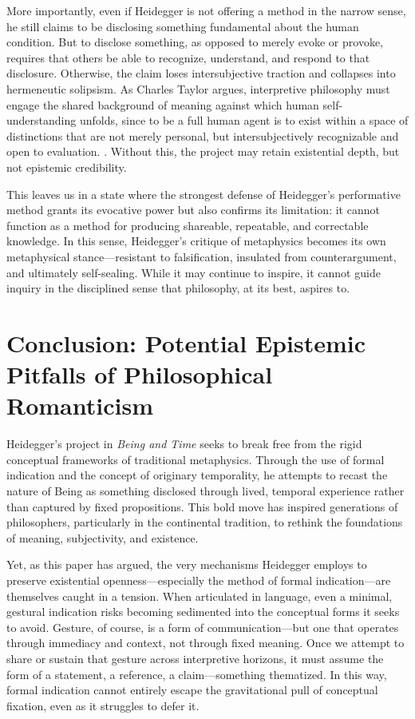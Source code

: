 \documentclass{article}
\begin{document}
More importantly, even if Heidegger is not offering a method in the narrow sense, he still claims to be disclosing something fundamental about the human condition. But to disclose something, as opposed to merely evoke or provoke, requires that others be able to recognize, understand, and respond to that disclosure. Otherwise, the claim loses intersubjective traction and collapses into hermeneutic solipsism. As Charles Taylor argues, interpretive philosophy must engage the shared background of meaning against which human self-understanding unfolds, since to be a full human agent is to exist within a space of distinctions that are not merely personal, but intersubjectively recognizable and open to evaluation. \parencite[p.~3]{taylor1985}. Without this, the project may retain existential depth, but not epistemic credibility.

This leaves us in a state where the strongest defense of Heidegger's performative method grants its evocative power but also confirms its limitation: it cannot function as a method for producing shareable, repeatable, and correctable knowledge. In this sense, Heidegger's critique of metaphysics becomes its own metaphysical stance—resistant to falsification, insulated from counterargument, and ultimately self-sealing. While it may continue to inspire, it cannot guide inquiry in the disciplined sense that philosophy, at its best, aspires to.

\section*{Conclusion: Potential Epistemic Pitfalls of Philosophical Romanticism}

Heidegger’s project in \textit{Being and Time} seeks to break free from the rigid conceptual frameworks of traditional metaphysics. Through the use of formal indication and the concept of originary temporality, he attempts to recast the nature of Being as something disclosed through lived, temporal experience rather than captured by fixed propositions. This bold move has inspired generations of philosophers, particularly in the continental tradition, to rethink the foundations of meaning, subjectivity, and existence.

Yet, as this paper has argued, the very mechanisms Heidegger employs to preserve existential openness—especially the method of formal indication—are themselves caught in a tension. When articulated in language, even a minimal, gestural indication risks becoming sedimented into the conceptual forms it seeks to avoid. Gesture, of course, is a form of communication—but one that operates through immediacy and context, not through fixed meaning. Once we attempt to share or sustain that gesture across interpretive horizons, it must assume the form of a statement, a reference, a claim—something thematized. In this way, formal indication cannot entirely escape the gravitational pull of conceptual fixation, even as it struggles to defer it.
\end{document}
